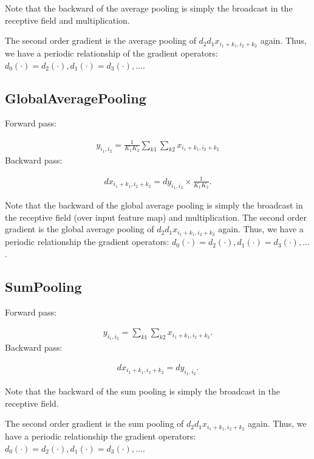 \documentclass{article}
\begin{document}
Note that the backward of the average pooling is simply the broadcast in the receptive field and multiplication.

The second order gradient is the average pooling of $d_2d_1 x_{i_1 + k_1, i_2 + k_2}$ again. Thus, we have a periodic relationship of the gradient operators: $d_0(\cdot) = d_2(\cdot), d_1(\cdot) = d_3(\cdot), \ldots$.


\subsection{GlobalAveragePooling}

Forward pass:

\begin{eqnarray}
  y_{i_1, i_2} = \frac{1}{K_1 K_2} \sum_{k1} \sum_{k2} x_{i_1 + k_1, i_2 + k_2}    
\end{eqnarray}
%
Backward pass:

\begin{eqnarray}
  dx_{i_1 + k_1, i_2 + k_2} = dy_{i_1, i_2} \times \frac{1}{K_1K_2}.
\end{eqnarray}

Note that the backward of the global average pooling is simply the broadcast in the receptive field (over input feature map) and multiplication.
The second order gradient is the global average pooling of $d_2d_1 x_{i_1 + k_1, i_2 + k_2}$ again. Thus, we have a periodic relationship the gradient operators: $d_0(\cdot) = d_2(\cdot), d_1(\cdot) = d_3(\cdot), \ldots$.

\subsection{SumPooling}

Forward pass:

\begin{eqnarray}
  y_{i_1, i_2} = \sum_{k1} \sum_{k2} x_{i_1 + k_1, i_2 + k_2}.
\end{eqnarray}
%
Backward pass:

\begin{eqnarray}
  dx_{i_1 + k_1, i_2 + k_2} = d y_{i_1, i_2}.
\end{eqnarray}

Note that the backward of the sum pooling is simply the broadcast in the receptive field.

The second order gradient is the sum pooling of $d_2d_1 x_{i_1 + k_1, i_2 + k_2}$ again. Thus, we have a periodic relationship the gradient operators: $d_0(\cdot) = d_2(\cdot), d_1(\cdot) = d_3(\cdot), \ldots$.
\end{document}
